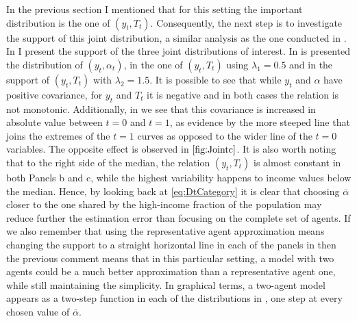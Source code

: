 \documentclass[english, a4paper,12pt]{article}
\begin{document}
In the previous section I mentioned that for this setting the important distribution is the one of $(y_{t}, T_{t})$. Consequently, the next step is to investigate the support of this joint distribution, a similar analysis as the one conducted in . In  I present the support of the three joint distributions of interest. In  is presented the distribution of $(y_{t}, \alpha_{t})$, in  the one of $(y_{t}, T_{t})$ using $\lambda_{1} = 0.5$ and in  the support of $(y_{t}, T_{t})$ with $\lambda_{2} = 1.5$. It is possible to see that while $y_{t}$ and $\alpha$ have positive covariance, for $y_{t}$ and $T_{t}$ it is negative and in both cases the relation is not monotonic. Additionally, in  we see that this covariance is increased in absolute value between $t = 0$ and $t = 1$, as evidence by the more steeped line that joins the extremes of the $t=1$ curves as opposed to the wider line of the $t=0$ variables. The opposite effect is observed in $\Cref{fig:Jointc}$. It is also worth noting that to the right side of the median, the relation $(y_{t}, T_{t})$ is almost constant in both Panels b and c, while the highest variability happens to income values below the median. Hence, by looking back at \eqref{eq:DtCategory} it is clear that choosing $\overline{\alpha}$ closer to the one shared by the high-income fraction of the population may reduce further the estimation error than focusing on the complete set of agents. If we also remember that using the representative agent approximation means changing the support to a straight horizontal line in each of the panels in  then the previous comment means that in this particular setting, a model with two agents could be a much better approximation than a representative agent one, while still maintaining the simplicity. In graphical terms, a two-agent model appears as a two-step function in each of the distributions in , one step at every chosen value of $\overline{\alpha}$.
\end{document}
